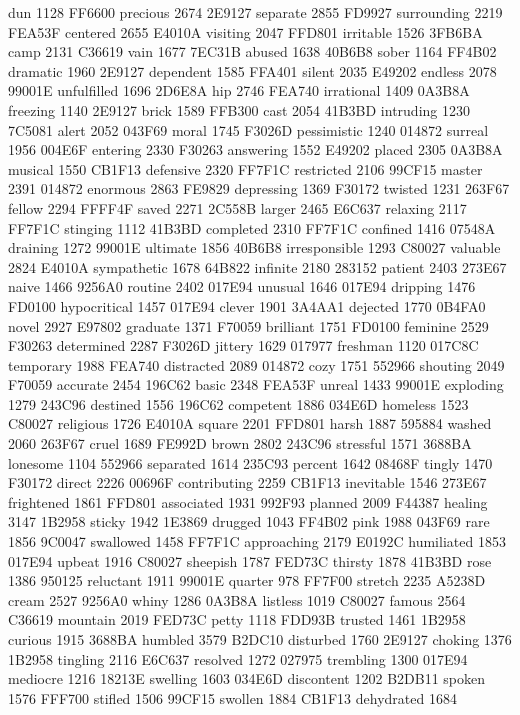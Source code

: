 dun 1128 FF6600 precious 2674 2E9127 separate 2855 FD9927 surrounding
2219 FEA53F centered 2655 E4010A visiting 2047 FFD801 irritable 1526
3FB6BA camp 2131 C36619 vain 1677 7EC31B abused 1638 40B6B8 sober 1164
FF4B02 dramatic 1960 2E9127 dependent 1585 FFA401 silent 2035 E49202
endless 2078 99001E unfulfilled 1696 2D6E8A hip 2746 FEA740 irrational
1409 0A3B8A freezing 1140 2E9127 brick 1589 FFB300 cast 2054 41B3BD
intruding 1230 7C5081 alert 2052 043F69 moral 1745 F3026D pessimistic
1240 014872 surreal 1956 004E6F entering 2330 F30263 answering 1552
E49202 placed 2305 0A3B8A musical 1550 CB1F13 defensive 2320 FF7F1C
restricted 2106 99CF15 master 2391 014872 enormous 2863 FE9829
depressing 1369 F30172 twisted 1231 263F67 fellow 2294 FFFF4F saved
2271 2C558B larger 2465 E6C637 relaxing 2117 FF7F1C stinging 1112
41B3BD completed 2310 FF7F1C confined 1416 07548A draining 1272 99001E
ultimate 1856 40B6B8 irresponsible 1293 C80027 valuable 2824 E4010A
sympathetic 1678 64B822 infinite 2180 283152 patient 2403 273E67 naive
1466 9256A0 routine 2402 017E94 unusual 1646 017E94 dripping 1476
FD0100 hypocritical 1457 017E94 clever 1901 3A4AA1 dejected 1770 0B4FA0
novel 2927 E97802 graduate 1371 F70059 brilliant 1751 FD0100 feminine
2529 F30263 determined 2287 F3026D jittery 1629 017977 freshman 1120
017C8C temporary 1988 FEA740 distracted 2089 014872 cozy 1751 552966
shouting 2049 F70059 accurate 2454 196C62 basic 2348 FEA53F unreal 1433
99001E exploding 1279 243C96 destined 1556 196C62 competent 1886 034E6D
homeless 1523 C80027 religious 1726 E4010A square 2201 FFD801 harsh
1887 595884 washed 2060 263F67 cruel 1689 FE992D brown 2802 243C96
stressful 1571 3688BA lonesome 1104 552966 separated 1614 235C93
percent 1642 08468F tingly 1470 F30172 direct 2226 00696F contributing
2259 CB1F13 inevitable 1546 273E67 frightened 1861 FFD801 associated
1931 992F93 planned 2009 F44387 healing 3147 1B2958 sticky 1942 1E3869
drugged 1043 FF4B02 pink 1988 043F69 rare 1856 9C0047 swallowed 1458
FF7F1C approaching 2179 E0192C humiliated 1853 017E94 upbeat 1916
C80027 sheepish 1787 FED73C thirsty 1878 41B3BD rose 1386 950125
reluctant 1911 99001E quarter 978 FF7F00 stretch 2235 A5238D cream 2527
9256A0 whiny 1286 0A3B8A listless 1019 C80027 famous 2564 C36619
mountain 2019 FED73C petty 1118 FDD93B trusted 1461 1B2958 curious 1915
3688BA humbled 3579 B2DC10 disturbed 1760 2E9127 choking 1376 1B2958
tingling 2116 E6C637 resolved 1272 027975 trembling 1300 017E94
mediocre 1216 18213E swelling 1603 034E6D discontent 1202 B2DB11 spoken
1576 FFF700 stifled 1506 99CF15 swollen 1884 CB1F13 dehydrated 1684
